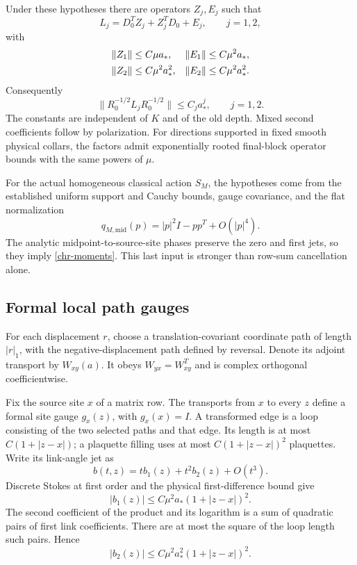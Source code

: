 \begin{theorem}
\label{chr-main}
Under these hypotheses there are operators \(Z_j,E_j\) such that
\begin{equation}
 L_j=D_0^TZ_j+Z_j^TD_0+E_j,\qquad j=1,2,
 \label{chr-decomposition}
\end{equation}
with
\begin{align}
 \|Z_1\|&\leq C\mu a_*,
 &\|E_1\|&\leq C\mu^2a_*,
 \notag\\
 \|Z_2\|&\leq C\mu^2a_*^2,
 &\|E_2\|&\leq C\mu^2a_*^2 .
 \label{chr-bounds}
\end{align}
Consequently
\begin{equation}
 \|R_0^{-1/2}L_jR_0^{-1/2}\|
       \leq C_j a_*^j,\qquad j=1,2.
 \label{chr-relative}
\end{equation}
The constants are independent of \(K\) and of the old depth.
Mixed second coefficients follow by polarization.  For directions
supported in fixed smooth physical collars, the factors admit
exponentially rooted final-block operator bounds with the same
powers of \(\mu\).
\end{theorem}

For the actual homogeneous classical action \(S_M\), the hypotheses
come from the established uniform support and Cauchy bounds, gauge
covariance, and the flat normalization
\[
 q_{M,\mathrm{mid}}(p)=|p|^2I-pp^T+O(|p|^4).
\]
The analytic midpoint-to-source-site phases preserve the zero and
first jets, so they imply \eqref{chr-moments}.  This last input is
stronger than row-sum cancellation alone.

\subsection{Formal local path gauges}
\label{chr-local-gauge}

For each displacement \(r\), choose a translation-covariant
coordinate path of length \(|r|_1\), with the negative-displacement
path defined by reversal.  Denote its adjoint transport by
\(W_{xy}(a)\).  It obeys \(W_{yx}=W_{xy}^T\) and is complex
orthogonal coefficientwise.

Fix the source site \(x\) of a matrix row.  The transports from \(x\)
to every \(z\) define a formal site gauge \(g_x(z)\), with
\(g_x(x)=I\).  A transformed edge is a loop consisting of the two
selected paths and that edge.  Its length is at most
\(C(1+|z-x|)\); a plaquette filling uses at most
\(C(1+|z-x|)^2\) plaquettes.  Write its link-angle jet as
\[
 b(t,z)=t b_1(z)+t^2b_2(z)+O(t^3).
\]
Discrete Stokes at first order and the physical first-difference
bound give
\begin{equation}
 |b_1(z)|\leq C\mu^2a_*(1+|z-x|)^2.
 \label{chr-b1}
\end{equation}
The second coefficient of the product and its logarithm is a sum
of quadratic pairs of first link coefficients.  There are at most
the square of the loop length such pairs.  Hence
\begin{equation}
 |b_2(z)|\leq C\mu^2a_*^2(1+|z-x|)^2.
 \label{chr-b2}
\end{equation}

